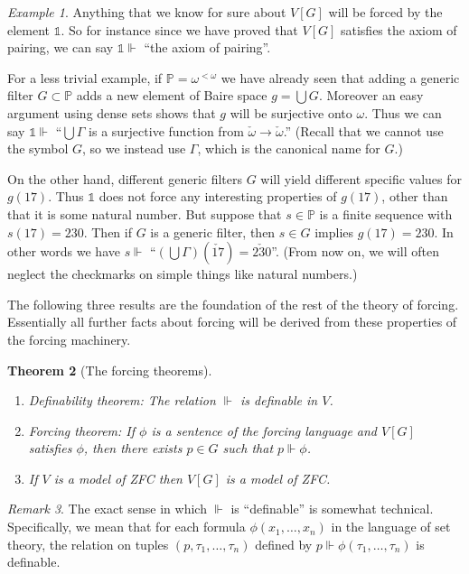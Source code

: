 \documentclass[11pt,oneside]{amsbook}
\newcommand{\forces}{\Vdash}
\theoremstyle{definition}
\theoremstyle{plain}
\newtheorem{theorem}{Theorem}[section]
\theoremstyle{definition}
\theoremstyle{remark}
\newtheorem{remark}[theorem]{Remark}
\newtheorem{example}[theorem]{Example}
\numberwithin{equation}{section}
\numberwithin{figure}{section}
\begin{document}
\begin{example}
  Anything that we know for sure about $V[G]$ will be forced by the element $\mathbb 1$. So for instance since we have proved that $V[G]$ satisfies the axiom of pairing, we can say $\mathbb 1\forces$ ``the axiom of pairing''.

  For a less trivial example, if $\mathbb P=\omega^{<\omega}$ we have already seen that adding a generic filter $G\subset\mathbb P$ adds a new element of Baire space $g=\bigcup G$. Moreover an easy argument using dense sets shows that $g$ will be surjective onto $\omega$. Thus we can say $\mathbb 1\forces$ ``$\bigcup\Gamma$ is a surjective function from $\check\omega\to\check\omega$.'' (Recall that we cannot use the symbol $G$, so we instead use $\Gamma$, which is the canonical name for $G$.)

  On the other hand, different generic filters $G$ will yield different specific values for $g(17)$. Thus $\mathbb 1$ does not force any interesting properties of $g(17)$, other than that it is some natural number. But suppose that $s\in\mathbb P$ is a finite sequence with $s(17)=230$. Then if $G$ is a generic filter, then $s\in G$ implies $g(17)=230$. In other words we have $s\forces$ ``$(\bigcup\Gamma)(\check{17})=\check{230}$''. (From now on, we will often neglect the checkmarks on simple things like natural numbers.)
\end{example}

The following three results are the foundation of the rest of the theory of forcing. Essentially all further facts about forcing will be derived from these properties of the forcing machinery.

\begin{theorem}[The forcing theorems]\
  \label{thm:forcing}
  \begin{enumerate}
    \item \textup{Definability theorem}: The relation $\forces$ is definable in $V$.
    \item \textup{Forcing theorem}: If $\phi$ is a sentence of the forcing language and $V[G]$ satisfies $\phi$, then there exists $p\in G$ such that $p\forces\phi$.
    \item If $V$ is a model of ZFC then $V[G]$ is a model of ZFC.
  \end{enumerate}
\end{theorem}

\begin{remark}
  The exact sense in which $\forces$ is ``definable'' is somewhat technical. Specifically, we mean that for each formula $\phi(x_1,\ldots,x_n)$ in the language of set theory, the relation on tuples $(p,\tau_1,\ldots,\tau_n)$ defined by $p\forces\phi(\tau_1,\ldots,\tau_n)$ is definable.
\end{remark}
\end{document}
